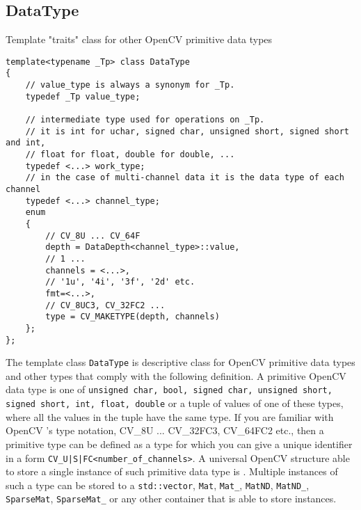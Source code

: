 \fi


\ifCpp
\subsection{DataType}\label{DataType}
Template "traits" class for other OpenCV primitive data types

\begin{lstlisting}
template<typename _Tp> class DataType
{
    // value_type is always a synonym for _Tp.
    typedef _Tp value_type;
    
    // intermediate type used for operations on _Tp.
    // it is int for uchar, signed char, unsigned short, signed short and int,
    // float for float, double for double, ...
    typedef <...> work_type;
    // in the case of multi-channel data it is the data type of each channel
    typedef <...> channel_type;
    enum
    {
        // CV_8U ... CV_64F
        depth = DataDepth<channel_type>::value,
        // 1 ... 
        channels = <...>,
        // '1u', '4i', '3f', '2d' etc.
        fmt=<...>,
        // CV_8UC3, CV_32FC2 ...
        type = CV_MAKETYPE(depth, channels)
    };
};
\end{lstlisting}

The template class \texttt{DataType} is descriptive class for OpenCV primitive data types and other types that comply with the following definition. A primitive OpenCV data type is one of \texttt{unsigned char, bool, signed char, unsigned short, signed short, int, float, double} or a tuple of values of one of these types, where all the values in the tuple have the same type. If you are familiar with OpenCV 's type notation, CV\_8U ... CV\_32FC3, CV\_64FC2 etc., then a primitive type can be defined as a type for which you can give a unique identifier in a form \texttt{CV\_<bit-depth>{U|S|F}C<number\_of\_channels>}. A universal OpenCV structure able to store a single instance of such primitive data type is . Multiple instances of such a type can be stored to a \texttt{std::vector}, \texttt{Mat}, \texttt{Mat\_}, \texttt{MatND}, \texttt{MatND\_}, \texttt{SparseMat}, \texttt{SparseMat\_} or any other container that is able to store  instances.
 
